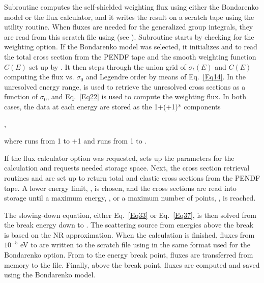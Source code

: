 Subroutine  computes the
self-shielded weighting flux using either the Bondarenko model
or the flux calculator, and it writes the result on a scratch tape
using the  utility routine.  When fluxes are needed
for the generalized group integrals, they are read from this
scratch file using  (see
).  Subroutine  starts by checking for
the weighting option.  If the Bondarenko model was selected, it
initializes  and
 to read the total
cross section from the PENDF tape and the smooth weighting function
$C(E)$ set up by .  It then
steps through the union grid of $\sigma_t(E)$ and $C(E)$ computing
the flux vs. $\sigma_0$ and Legendre order by means of Eq.~\ref{Eq14}.
In the unresolved energy range, 
is used to retrieve the unresolved cross sections as a function
of $\sigma_0$, and Eq.~\ref{Eq22} is used to compute the weighting
flux.  In both cases, the data at each energy are stored as the
1+(+1)* components

\vspace{6 pt}
,
\vspace{6 pt}

\noindent where  runs from 1 to +1 and
 runs from 1 to .

If the flux calculator option was requested,
 sets up the
parameters for the calculation and requests needed storage space.  Next,
the cross section retrieval routines  and  are
set up to return total and elastic cross sections from the PENDF tape.
A lower energy limit, , is chosen, and the cross
sections are read into storage until a maximum energy, , or a
maximum number of points, , is reached.

The slowing-down equation, either Eq.~\ref{Eq33} or Eq.~\ref{Eq37},
is then solved from the break energy down to .  The
scattering source from energies above the break is based on the
NR approximation.  When the
calculation is finished, fluxes from $10^{-5}$ eV to  are
written to the scratch file using  in the same format used
for the Bondarenko option.  From  to the energy break point,
fluxes are transferred from memory to the  file.  Finally,
above the break point, fluxes are computed and saved using the
Bondarenko model.

